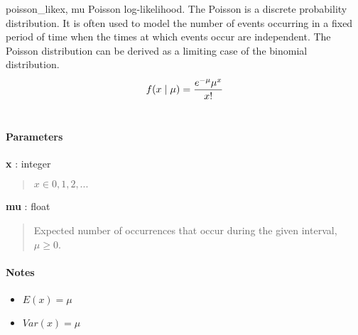 \hypertarget{pymc.distributions.poisson_like}{}
\begin{funcdesc}{poisson\_like}{x, mu}
Poisson log-likelihood. The Poisson is a discrete probability distribution.
It is often used to model the number of events occurring in a fixed period of 
time when the times at which events occur are independent. The Poisson 
distribution can be derived as a limiting case of the binomial distribution.
\begin{gather}
\begin{split}f(x \mid \mu) = \frac{e^{-\mu}\mu^x}{x!}\end{split}\notag\\\begin{split}\end{split}\notag
\end{gather}
\paragraph{Parameters}
\begin{paramlist}
\item[]\textbf{x} : integer
\begin{quote}

$x \in {0,1,2,...}$
\end{quote}

\item[]\textbf{mu} : float
\begin{quote}

Expected number of occurrences that occur during the given interval,
$\mu \geq 0$.
\end{quote}
\end{paramlist}
\paragraph{Notes}
\begin{itemize}
\item {} 
$E(x)=\mu$

\item {} 
$Var(x)=\mu$

\end{itemize}
\end{funcdesc}

